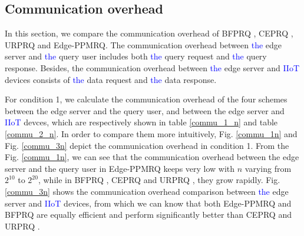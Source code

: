 \documentclass[IEEE JOURNAL OF BIOMEDICAL AND HEALTH INFORMATICS]{IEEEtran}
\begin{document}
{\subsection{Communication overhead}
In this section, we compare the communication overhead of BFPRQ \cite{mahdikhani2020IoT}, CEPRQ \cite{hasan2020IoT}, URPRQ \cite{mahdikhani2020using} and Edge-PPMRQ. The communication overhead between \textcolor{blue}{the} edge server and \textcolor{blue}{the} query user includes both \textcolor{blue}{the} query request and \textcolor{blue}{the} query response. Besides, the communication overhead between \textcolor{blue}{the} edge server and \textcolor{blue}{IIoT} devices consists of \textcolor{blue}{the} data request and \textcolor{blue}{the} data response.

  For condition 1, we calculate the communication overhead of the four schemes between the edge server and the query user, and between the edge server and \textcolor{blue}{IIoT} devces, which are respectively shown in table \ref{commu_1_n} and table \ref{commu_2_n}.  In order to compare them more intuitively, Fig. \ref{commu_1n} and Fig. \ref{commu_3n} depict the communication overhead in condition 1. From the Fig. \ref{commu_1n}, we can see that the communication overhead between the edge server and the query user in Edge-PPMRQ keeps very low with $n$ varying from $2^{10}$ to $2^{20}$, while in BFPRQ \cite{mahdikhani2020IoT}, CEPRQ \cite{hasan2020IoT} and URPRQ \cite{mahdikhani2020using}, they grow rapidly. Fig. \ref{commu_3n} shows the communication overhead comparison between \textcolor{blue}{the} edge server and \textcolor{blue}{IIoT} devices, from which we can know that both Edge-PPMRQ and BFPRQ \cite{mahdikhani2020IoT} are equally efficient and perform significantly better than CEPRQ \cite{hasan2020IoT} and URPRQ \cite{mahdikhani2020using}.

}
\end{document}
